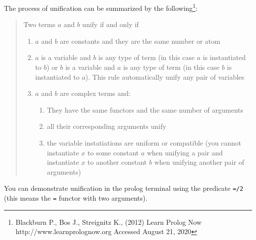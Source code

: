 The process of unification can be summarized by the
following\footnote{Blackburn P., Bos J., Streignitz K., (2012) Learn
  Prolog Now http://www.learnprolognow.org Accessed August 21, 2020}:

\begin{quote}
Two terms \(a\) and \(b\) unify if and only if

\begin{enumerate}
\def\labelenumi{\arabic{enumi}.}
\tightlist
\item
  \(a\) and \(b\) are constants and they are the same number or atom
\item
  \(a\) is a variable and \(b\) is any type of term (in this case \(a\)
  is instantiated to \(b\)) or \(b\) is a variable and \(a\) is any type
  of term (in this case \(b\) is instantiated to \(a\)). This rule
  automatically unify any pair of variables
\item
  \(a\) and \(b\) are complex terms and:

  \begin{enumerate}
  \def\labelenumii{\arabic{enumii}.}
  \tightlist
  \item
    They have the same functors and the same number of arguments
  \item
    all their corresponding arguments unify
  \item
    the variable instatiations are uniform or compatible (you cannot
    instantiate \(x\) to some constant \(a\) when unifying a pair and
    instantiate \(x\) to another constant \(b\) when unifying another
    pair of arguments)
  \end{enumerate}
\end{enumerate}
\end{quote}

You can demonstrate unification in the prolog terminal using the
predicate \texttt{=/2} (this means the \texttt{=} functor with two
arguments).

\begin{Shaded}
\begin{Highlighting}[]
 \KeywordTok{=}\KeywordTok{,}
\end{Highlighting}
\end{Shaded}

\begin{Shaded}
\begin{Highlighting}[]
 \KeywordTok{=}\KeywordTok{,}
\end{Highlighting}
\end{Shaded}

